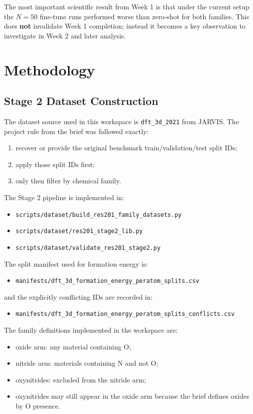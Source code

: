 \documentclass[11pt]{article}
\begin{document}
The most important scientific result from Week 1 is that under the current setup the $N=50$ fine-tune runs performed worse than zero-shot for both families. This does \textbf{not} invalidate Week 1 completion; instead it becomes a key observation to investigate in Week 2 and later analysis.

\section{Methodology}

\subsection{Stage 2 Dataset Construction}
The dataset source used in this workspace is \texttt{dft\_3d\_2021} from JARVIS.
The project rule from the brief was followed exactly:
\begin{enumerate}
  \item recover or provide the original benchmark train/validation/test split IDs;
  \item apply those split IDs first;
  \item only then filter by chemical family.
\end{enumerate}

The Stage 2 pipeline is implemented in:
\begin{itemize}
  \item \texttt{scripts/dataset/build\_res201\_family\_datasets.py}
  \item \texttt{scripts/dataset/res201\_stage2\_lib.py}
  \item \texttt{scripts/dataset/validate\_res201\_stage2.py}
\end{itemize}

The split manifest used for formation energy is:
\begin{itemize}
  \item \texttt{manifests/dft\_3d\_formation\_energy\_peratom\_splits.csv}
\end{itemize}
and the explicitly conflicting IDs are recorded in:
\begin{itemize}
  \item \texttt{manifests/dft\_3d\_formation\_energy\_peratom\_splits\_conflicts.csv}
\end{itemize}

The family definitions implemented in the workspace are:
\begin{itemize}
  \item oxide arm: any material containing O;
  \item nitride arm: materials containing N and not O;
  \item oxynitrides: excluded from the nitride arm;
  \item oxynitrides may still appear in the oxide arm because the brief defines oxides by O presence.
\end{itemize}
\end{document}
